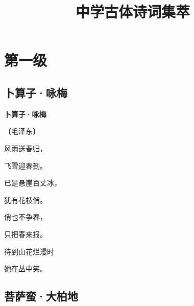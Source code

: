 \documentclass[12pt,UTF-8,openany,fontset=none]{ctexbook}
\title{\zihao{0} \bfseries 中学古体诗词集萃}
\author{}
\date{}
\begin{document}
\maketitle
\tableofcontents
\newpage

\chapter{第一级}
\clearpage

\section{卜算子·咏梅}


\begin{center}
    {\bfseries 卜算子·咏梅}

    \vspace{18pt}

    \begin{large}\xuwen
        〔毛泽东〕
    \end{large}

\end{center}

    \vspace{18pt}  %

\begin{center}
    \begin{Large}

        风雨送春归，

        飞雪迎春到。

        已是悬崖百丈冰，

        犹有花枝俏。

        \vspace{18pt}  %

        俏也不争春，

        只把春来报。

        待到山花烂漫时

        她在丛中笑。

    \end{Large}

\end{center}

\vspace{8pt}
\clearpage

\section{菩萨蛮·大柏地}
\end{document}
